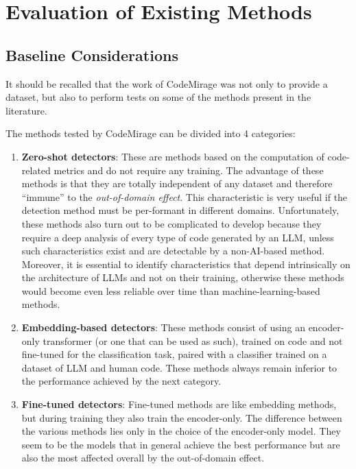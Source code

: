 \section{Evaluation of Existing Methods}
\subsection{Baseline Considerations}
It should be recalled that the work of 
CodeMirage\cite{guo2025codemirage} was not only to 
provide a dataset, but also to perform tests on 
some of the methods present in the literature.

The methods tested by CodeMirage can be divided into 4 categories:
\begin{enumerate}
    \item \textbf{Zero-shot detectors}: 
    These are methods based on the computation of code-related metrics and do not require any training.
    \newline The advantage of these methods is that they are totally independent of any dataset 
    and therefore “immune” to the \textit{out-of-domain effect}. This characteristic is very useful 
    if the detection method must be per-formant in different domains. 
    \newline Unfortunately, these methods also turn out to be complicated to develop 
    because they require a deep analysis of every type of code generated by an LLM, 
    unless such characteristics exist and are detectable by a non-AI-based method. 
    \newline Moreover, it is essential to identify characteristics that depend intrinsically on the 
    architecture of LLMs and not on their training, otherwise these methods would 
    become even less reliable over time than machine-learning-based methods.

    
    \item \textbf{Embedding-based detectors}: 
    These methods consist of using an encoder-only transformer 
    (or one that can be used as such), trained on code and not 
    fine-tuned for the classification task, paired with a classifier 
    trained on a dataset of LLM and human code.
    \newline These methods always remain inferior to the performance achieved by the next category.
    
    \item \textbf{Fine-tuned detectors}: 
    Fine-tuned methods are like embedding methods, but during training they 
    also train the encoder-only. The difference between the various methods 
    lies only in the choice of the encoder-only model. They seem to be the 
    models that in general achieve the best performance but are also the most 
    affected overall by the out-of-domain effect.
    

\end{enumerate}
